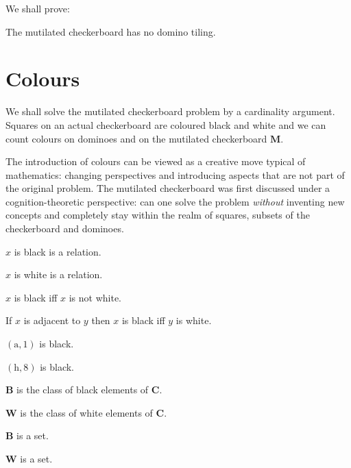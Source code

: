 \documentclass{article}
\newcommand{\fileA}{\mathrm{a}}
\newcommand{\fileH}{\mathrm{h}}
\newcommand{\Checkerboard}{\mathbf{C}}
\newcommand{\Mutilated}{\mathbf{M}}
\newcommand{\Black}{\mathbf{B}}
\newcommand{\White}{\mathbf{W}}
\begin{document}
\noindent
We shall prove:

\begin{quotedtheorem}
    The mutilated checkerboard has no domino tiling.
\end{quotedtheorem}



\section{Colours}

We shall solve the mutilated checkerboard problem by a cardinality argument.
Squares on an actual checkerboard are coloured black and white and we can count
colours on dominoes and on the mutilated checkerboard $\Mutilated$.

The introduction of colours can be viewed as a creative move typical of
mathematics: changing perspectives and introducing aspects that are not part
of the original problem. The mutilated checkerboard was first discussed under
a cognition-theoretic perspective: can one solve the problem {\emph{without}}
inventing new concepts and completely stay within the realm of squares,
subsets of the checkerboard and dominoes.


\begin{forthel}
    \begin{signature} $x$ is black is a relation. \end{signature}
    \begin{signature} $x$ is white is a relation. \end{signature}

    \begin{axiom} $x$ is black iff $x$ is not white. \end{axiom}
    \begin{axiom} If $x$ is adjacent to $y$ then $x$ is black iff $y$ is white. \end{axiom}

    \begin{axiom} $(\fileA,1)$ is black. \end{axiom}
    \begin{axiom} $(\fileH,8)$ is black. \end{axiom}

    \begin{definition} $\Black$ is the class of black elements of $\Checkerboard$. \end{definition}
    \begin{definition} $\White$ is the class of white elements of $\Checkerboard$. \end{definition}

    \begin{lemma} $\Black$ is a set. \end{lemma}
    \begin{lemma} $\White$ is a set. \end{lemma}
\end{forthel}
\end{document}
